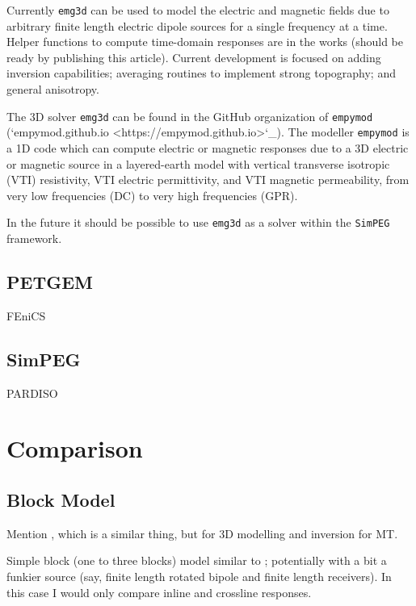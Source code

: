 \documentclass[
    paper,
  ]{geophysics}
\newcommand{\emg}[2]{\texttt{emg#1#2}\xspace}
\newcommand{\empymod}{\texttt{empymod}\xspace}
\newcommand{\simpeg}{\texttt{SimPEG}\xspace}
\begin{document}
Currently \emg3d can be used to model the electric and magnetic fields due to
arbitrary finite length electric dipole sources for a single frequency at a
time. Helper functions to compute time-domain responses are in the works
(should be ready by publishing this article). Current development is focused
on adding inversion capabilities; averaging routines to implement strong
topography; and general anisotropy.

The 3D solver \emg3d can be found in the GitHub organization of \empymod
(`empymod.github.io <https://empymod.github.io>`_). The modeller \empymod
\citep{GEO.17.Werthmuller} is a 1D code which can compute electric or
magnetic responses due to a 3D electric or magnetic source in a layered-earth
model with vertical transverse isotropic (VTI) resistivity, VTI electric
permittivity, and VTI magnetic permeability, from very low frequencies (DC) to
very high frequencies (GPR).

In the future it should be possible to use \emg3d as a solver within the
\simpeg framework.


\subsection{PETGEM}

\cite{GJI.19.CastilloReyes}

FEniCS \citep{CSE.15.Alnaes}


\subsection{SimPEG}

\cite{CAG.15.Cockett}

PARDISO \citep{FGCS.04.Schenk}



\section{Comparison}

\subsection{Block Model}

Mention \cite{GJI.13.Miensopust}, which is a similar thing, but for 3D
modelling and inversion for MT.

Simple block (one to three blocks) model similar to \cite{GJI.13.Miensopust};
potentially with a bit a funkier source (say, finite length rotated bipole and
finite length receivers). In this case I would only compare inline and
crossline responses.
\end{document}
